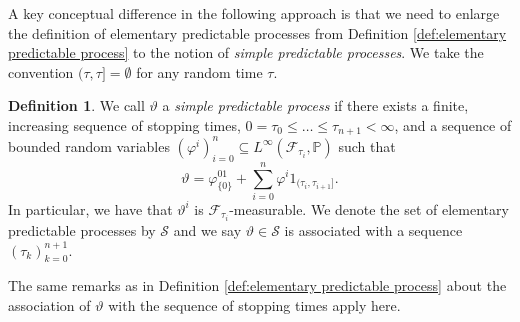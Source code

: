 \documentclass[11pt,a4paper,twoside,openany]{report}
\numberwithin{equation}{section}
\theoremstyle{plain} %
\theoremstyle{definition} %
\newtheorem{definition}[theorem]{Definition}
\theoremstyle{remark} %
\begin{document}
A key conceptual difference in the following approach is that we need to enlarge the definition of elementary predictable processes from Definition \ref{def:elementary predictable process} to the notion of \textit{simple predictable processes}. We take the convention \((\tau,\tau]=\emptyset\) for any random time \(\tau\).

\begin{definition}\label{def:simple predictable process}
    We call \(\vartheta\) a \textit{simple predictable process} if there exists a finite, increasing sequence of stopping times, \(0=\tau_0\leq\dots\leq\tau_{n+1}<\infty\), and a sequence of bounded random variables \((\varphi^i)_{i=0}^n\subseteq L^{\infty}(\mathcal{F}_{\tau_i},\mathbb{P})\) such that 
    \begin{equation*}
        \vartheta = \varphi^01_{\{0\}}+\sum_{i=0}^n\varphi^i1_{(\tau_i,\tau_{i+1}]}.
    \end{equation*}
In particular, we have that \(\vartheta^i\) is \(\mathcal{F}_{\tau_i}\)-measurable. We denote the set of elementary predictable processes by \(\mathcal{S}\) and we say \(\vartheta\in\mathcal{S}\) is associated with a sequence \((\tau_k)_{k=0}^{n+1}\).
\end{definition}
The same remarks as in Definition \ref{def:elementary predictable process} about the association of \(\vartheta\) with the sequence of stopping times apply here. 
\end{document}
